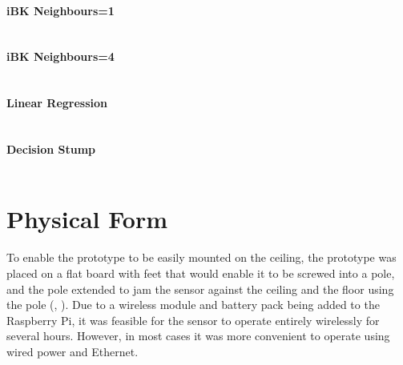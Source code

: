 \subsubsection{iBK Neighbours=1}
\inputminted[fontsize=\footnotesize,breaklines=true]{text}{../data/processed/third/numeric-ibk-1.txt}
\clearpage

\subsubsection{iBK Neighbours=4}
\inputminted[fontsize=\footnotesize,breaklines=true]{text}{../data/processed/third/numeric-ibk-4.txt}
\clearpage

\subsubsection{Linear Regression}
\inputminted[fontsize=\footnotesize,breaklines=true]{text}{../data/processed/third/numeric-linear-reg.txt}
\clearpage

\subsubsection{Decision Stump}
\inputminted[fontsize=\footnotesize,breaklines=true]{text}{../data/processed/third/numeric-decision-stump.txt}

\chapter{Physical Form}
To enable the prototype to be easily mounted on the ceiling, the prototype was placed on a flat board with feet that would enable it to be screwed into a pole, and the pole extended to jam the sensor against the ceiling and the floor using the pole (, ). Due to a wireless module and battery pack being added to the Raspberry Pi, it was feasible for the sensor to operate entirely wirelessly for several hours. However, in most cases it was more convenient to operate using wired power and Ethernet.

